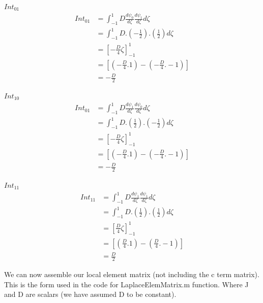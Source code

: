 \documentclass[11pt]{article}
\begin{document}
\underline{$Int_{01}$} \\


\begin{equation}\label{eq:Int01}
\begin{split}
 Int_{01} &= \int_{-1}^{1} D \frac{d\psi_{0}}{d\zeta} \frac{d\psi_{1}}{d \zeta} d \zeta \\
&=  \int_{-1}^{1} D .( -\frac{1}{2}). (\frac{1}{2}) d\zeta \\
& = \left[-\frac{D}{4} \zeta \right]_{-1}^{1} \\
& = \left[ (-\frac{D}{4}.1) - (-\frac{D}{4}.-1) \right] \\
& = -\frac{D}{2}
\end{split}
\end{equation}

\underline{$Int_{10}$} \\


\begin{equation}\label{eq:Int10}
\begin{split}
 Int_{01} &= \int_{-1}^{1} D \frac{d\psi_{1}}{d\zeta} \frac{d\psi_{0}}{d \zeta} d \zeta \\
&=  \int_{-1}^{1} D .( \frac{1}{2}). (-\frac{1}{2}) d\zeta \\
& = \left[-\frac{D}{4} \zeta \right]_{-1}^{1} \\
& = \left[ (-\frac{D}{4}.1) - (-\frac{D}{4}.-1) \right] \\
& = -\frac{D}{2}
\end{split}
\end{equation}


\clearpage

\underline{$Int_{11}$} \\


\begin{equation}\label{eq:Int11}
\begin{split}
 Int_{11} &= \int_{-1}^{1} D \frac{d\psi_{1}}{d\zeta} \frac{d\psi_{1}}{d \zeta} d \zeta \\
&=  \int_{-1}^{1} D .( \frac{1}{2}). (\frac{1}{2}) d\zeta \\
& = \left [\frac{D}{4} \zeta \right ]_{-1}^{1} \\
& = \left [ (\frac{D}{4}.1) - (\frac{D}{4}.-1) \right ] \\
& = \frac{D}{2}
\end{split}
\end{equation}

We can now assemble our local element matrix (not including the c term matrix). This is the form used in the code for LaplaceElemMatrix.m function. Where J and D are scalars (we have assumed D to be constant).
\end{document}
